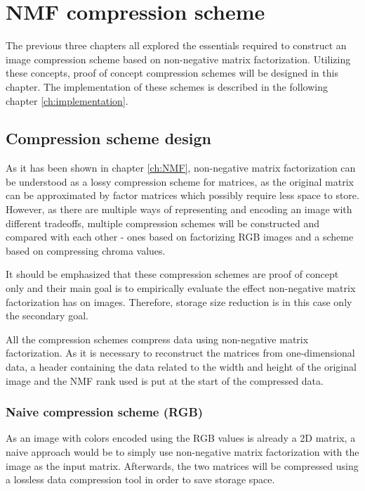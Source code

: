 \documentclass[thesis=M,english]{FITthesis}[2012/10/20]
\begin{document}


\chapter{NMF compression scheme}
\label{ch:nmfcompr}
The previous three chapters all explored the essentials required to construct an image
compression scheme based on non-negative matrix factorization. Utilizing these concepts,
proof of concept compression schemes will be designed in this chapter. The implementation
of these schemes is described in the following chapter \ref{ch:implementation}.

\section{Compression scheme design}
As it has been shown in chapter \ref{ch:NMF}, non-negative matrix factorization
can be understood as a lossy compression scheme for matrices, as the original
matrix can be approximated by factor matrices which possibly require less
space to store. However, as there are multiple ways of representing and encoding
an image with different tradeoffs, multiple compression schemes will be constructed
and compared with each other - ones based on factorizing RGB images and a scheme based
on compressing chroma values.

It should be emphasized that these compression schemes are proof of concept only
and their main goal is to empirically evaluate the effect non-negative matrix
factorization has on images. Therefore, storage size reduction is in this case only
the secondary goal.

All the compression schemes compress data using non-negative matrix factorization.
As it is necessary to reconstruct the matrices from one-dimensional data, a header
containing the data related to the width and height of the original image and
the NMF rank used is put at the start of the compressed data.


\subsection{Naive compression scheme (RGB)}
As an image with colors encoded using the RGB values is already
a 2D matrix, a naive approach would be to simply use non-negative
matrix factorization with the image as the input matrix. Afterwards,
the two matrices will be compressed using a lossless data compression
tool in order to save storage space.
\end{document}
